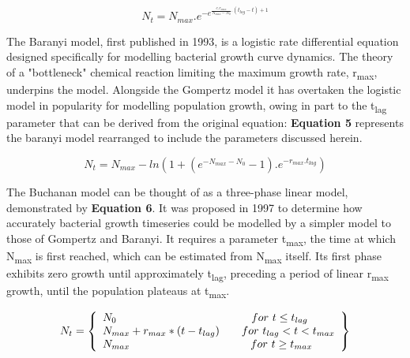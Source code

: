 \documentclass[11pt]{article}
\begin{document}
\begin{equation}
    N_{t} = N_{max} . e^{-e^{\frac{ e . r_{max}   }
                                  { N_{max}-N_{0} } . (t_{lag} - t) + 1}}
\end{equation}
\vspace{3mm}



The Baranyi model, first published in 1993, is a logistic rate differential equation designed specifically for modelling bacterial growth curve dynamics.\parencite{Baranyi1993,Buchanan1997} The theory of a "bottleneck" chemical reaction limiting the maximum growth rate, r\textsubscript{max}, underpins the model.\parencite{Buchanan1997} Alongside the Gompertz model it has overtaken the logistic model in popularity for modelling population growth, owing in part to the t\textsubscript{lag} parameter that can be derived from the original equation: \textbf{Equation 5} represents the baranyi model rearranged to include the parameters discussed herein.

\begin{equation}
    N_{t} = N_{max} - ln{(1 + (e^{-N_{max} - N_{0}} - 1) . e^{-r_{max} . t_{lag}})}
\end{equation}
\vspace{3mm}



The Buchanan model can be thought of as a three-phase linear model, demonstrated by \textbf{Equation 6}.\parencite{Buchanan1997} It was proposed in 1997 to determine how accurately bacterial growth timeseries could be modelled by a simpler model to those of Gompertz and Baranyi. It requires a parameter t\textsubscript{max}, the time at which N\textsubscript{max} is first reached, which can be estimated from N\textsubscript{max} itself. Its first phase exhibits zero growth until approximately t\textsubscript{lag}, preceding a period of linear r\textsubscript{max} growth, until the population plateaus at t\textsubscript{max}.\parencite{Buchanan1997}

\begin{equation}
    N_{t} = \left\{
    \begin{array}{l}
        N_{0}                   \hspace{43mm}    for \           t \le t_{lag}\\
        N_{max} + r_{max} * (t - t_{lag}) \qquad for \ t_{lag} < t  <  t_{max}\\
        N_{max}                 \hspace{38.5mm}  for \           t \ge t_{max}\\
    \end{array}\right\}
\end{equation}
\vspace{5mm}
\end{document}
